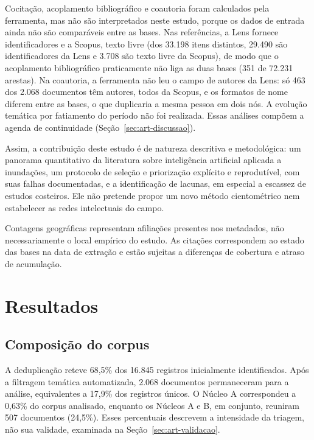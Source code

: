 Cocitação, acoplamento bibliográfico e coautoria foram calculados pela ferramenta, mas não são interpretados neste estudo, porque os dados de entrada ainda não são comparáveis entre as bases. Nas referências, a Lens fornece identificadores e a Scopus, texto livre (dos 33.198 itens distintos, 29.490 são identificadores da Lens e 3.708 são texto livre da Scopus), de modo que o acoplamento bibliográfico praticamente não liga as duas bases (351 de 72.231 arestas). Na coautoria, a ferramenta não leu o campo de autores da Lens: só 463 dos 2.068 documentos têm autores, todos da Scopus, e os formatos de nome diferem entre as bases, o que duplicaria a mesma pessoa em dois nós. A evolução temática por fatiamento do período não foi realizada. Essas análises compõem a agenda de continuidade (Seção~\ref{sec:art-discussao}).

Assim, a contribuição deste estudo é de natureza descritiva e metodológica: um panorama quantitativo da literatura sobre inteligência artificial aplicada a inundações, um protocolo de seleção e priorização explícito e reprodutível, com suas falhas documentadas, e a identificação de lacunas, em especial a escassez de estudos costeiros. Ele não pretende propor um novo método cientométrico nem estabelecer as redes intelectuais do campo.

Contagens geográficas representam afiliações presentes nos metadados, não necessariamente o local empírico do estudo. As citações correspondem ao estado das bases na data de extração e estão sujeitas a diferenças de cobertura e atraso de acumulação.

\section{Resultados}
\label{sec:art-resultados}

\subsection{Composição do corpus}

A deduplicação reteve 68,5\% dos 16.845 registros inicialmente identificados. Após a filtragem temática automatizada, 2.068 documentos permaneceram para a análise, equivalentes a 17,9\% dos registros únicos. O Núcleo A correspondeu a 0,63\% do corpus analisado, enquanto os Núcleos A e B, em conjunto, reuniram 507 documentos (24,5\%). Esses percentuais descrevem a intensidade da triagem, não sua validade, examinada na Seção~\ref{sec:art-validacao}.

